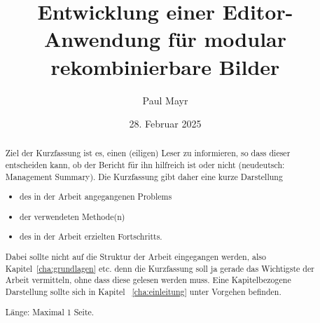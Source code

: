 \documentclass[oneside]{ausarbeitung}
\begin{document}

  \Projektbericht


\Informatik

\title{Entwicklung einer Editor-Anwendung für modular rekombinierbare Bilder}

\author{Paul Mayr}

   \examinerIsAProfessorfalse  %


\date{28. Februar 2025}


\maketitle
\cleardoublepage

\setcounter{page}{1}



\makeaffirmation
\cleardoublepage

\begin{abstract}
  Ziel der Kurzfassung ist es, einen (eiligen) Leser zu informieren, so 
  dass dieser entscheiden kann, ob der Bericht für ihn hilfreich ist oder 
  nicht (neudeutsch: Management Summary). Die Kurzfassung gibt daher eine 
  kurze Darstellung

  \begin{itemize}
    \item des in der Arbeit angegangenen Problems
    \item der verwendeten Methode(n)
    \item des in der Arbeit erzielten Fortschritts.
  \end{itemize}

  Dabei sollte nicht auf die Struktur der Arbeit eingegangen werden, also 
  Kapitel~\ref{cha:grundlagen} etc. denn die Kurzfassung soll ja gerade 
  das Wichtigste der Arbeit vermitteln, ohne dass diese gelesen werden muss.
  Eine Kapitelbezogene Darstellung sollte sich in Kapitel~%
  \ref{cha:einleitung} unter Vorgehen befinden.

  Länge: Maximal 1 Seite.
\end{abstract}
\cleardoublepage
\tableofcontents
\end{document}
